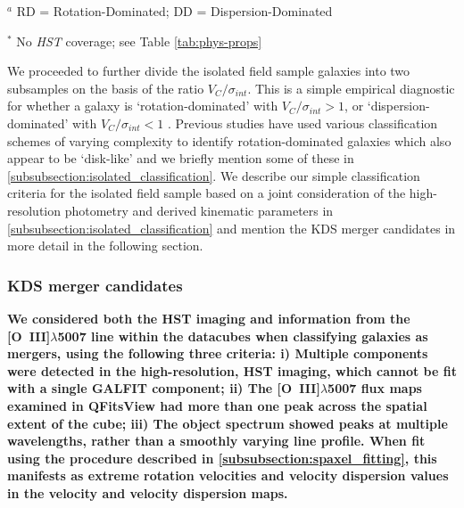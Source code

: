 \documentclass[fleqn,usenatbib]{mnras}
\begin{document}
\begin{table*}
\begin{threeparttable}
\begin{tabular}{llllllll}
\end{tabular}
\begin{tablenotes}
      \small
      \item $^{a}$ RD = Rotation-Dominated; DD = Dispersion-Dominated
      \item $^{*}$ No {\em HST} coverage; see Table \ref{tab:phys-props}
    \end{tablenotes}
  \end{threeparttable}
  \end{table*}

We proceeded to further divide the isolated field sample galaxies into two subsamples on the basis of the ratio $V_{C}/\sigma_{int}$.
This is a simple empirical diagnostic for whether a galaxy is `rotation-dominated' with $V_{C}/\sigma_{int} > 1$, or `dispersion-dominated' with $V_{C}/\sigma_{int} < 1$  \citep[i.e. a method to measure the prevalence of rotational and random motions;][]{Epinat2012,Wisnioski2015,Stott2016,Harrison2017}.
Previous studies have used various classification schemes of varying complexity to identify rotation-dominated galaxies which also appear to be `disk-like' and we briefly mention some of these in \cref{subsubsection:isolated_classification}.
We describe our simple classification criteria for the isolated field sample based on a joint consideration of the high-resolution photometry and derived kinematic parameters in \cref{subsubsection:isolated_classification} and mention the KDS merger candidates in more detail in the following section.

\subsubsection{KDS merger candidates}\label{subsubsection:merger_candidates}
\textbf{We considered both the HST imaging and information from the [O~{\sc III}]$\lambda$5007 line within the datacubes when classifying galaxies as mergers, using the following three criteria: i) Multiple components were detected in the high-resolution, HST imaging, which cannot be fit with a single {\scriptsize GALFIT} component; ii) The [O~{\sc III}]$\lambda$5007 flux maps examined in {\scriptsize QFitsView} \citep{Ott2012} had more than one peak across the spatial extent of the cube; iii) The object spectrum showed peaks at multiple wavelengths, rather than a smoothly varying line profile. When fit using the procedure described in \cref{subsubsection:spaxel_fitting}, this manifests as extreme rotation velocities and velocity dispersion values in the velocity and velocity dispersion maps.}
\end{document}
